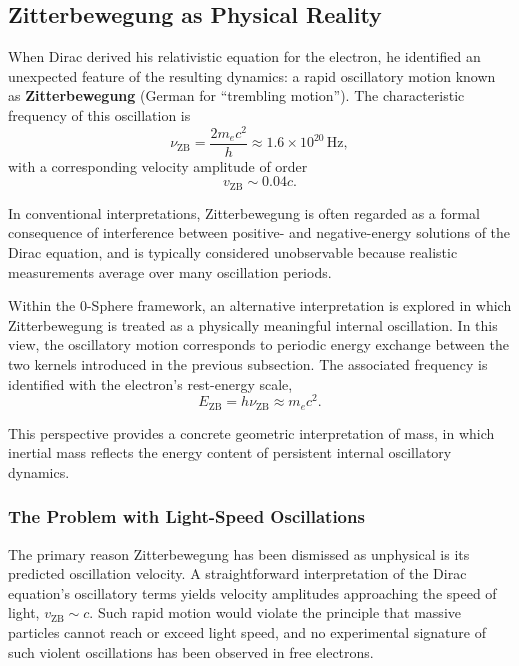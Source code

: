 \documentclass[12pt,letterpaper]{article}
\begin{document}

\subsection{Zitterbewegung as Physical Reality}
\label{subsec:zitterbewegung}

When Dirac derived his relativistic equation for the electron, he identified an unexpected feature of the resulting dynamics: a rapid oscillatory motion known as \textbf{Zitterbewegung} (German for ``trembling motion''). The characteristic frequency of this oscillation is
\begin{equation}
\nu_{\mathrm{ZB}} = \frac{2 m_e c^2}{h} \approx 1.6 \times 10^{20} \, \mathrm{Hz},
\end{equation}
with a corresponding velocity amplitude of order
\begin{equation}
v_{\mathrm{ZB}} \sim 0.04c.
\end{equation}

In conventional interpretations, Zitterbewegung is often regarded as a formal consequence of interference between positive- and negative-energy solutions of the Dirac equation, and is typically considered unobservable because realistic measurements average over many oscillation periods.

Within the 0-Sphere framework, an alternative interpretation is explored in which Zitterbewegung is treated as a physically meaningful internal oscillation. In this view, the oscillatory motion corresponds to periodic energy exchange between the two kernels introduced in the previous subsection. The associated frequency is identified with the electron's rest-energy scale,
\begin{equation}
E_{\mathrm{ZB}} = h \nu_{\mathrm{ZB}} \approx m_e c^2.
\end{equation}

This perspective provides a concrete geometric interpretation of mass, in which inertial mass reflects the energy content of persistent internal oscillatory dynamics.

\subsubsection{The Problem with Light-Speed Oscillations}
\label{subsubsec:lightspeed_problem}

The primary reason Zitterbewegung has been dismissed as unphysical is its predicted oscillation velocity. A straightforward interpretation of the Dirac equation's oscillatory terms yields velocity amplitudes approaching the speed of light, $v_{\mathrm{ZB}} \sim c$. Such rapid motion would violate the principle that massive particles cannot reach or exceed light speed, and no experimental signature of such violent oscillations has been observed in free electrons.
\end{document}
